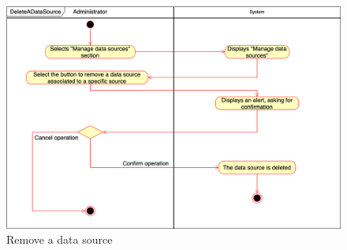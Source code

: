     \begin{figure}[h!]
        \centering
        \includegraphics[scale=0.35]{images/use_cases_diagram/administrator_delete_datasource.png}
        \caption{Remove a data source}
        \label{fig:administrator_remove_datasource}
    \end{figure}
 \FloatBarrier   
 
 \newpage